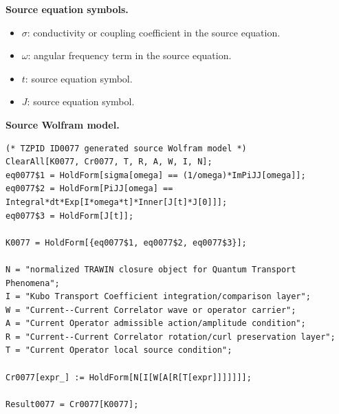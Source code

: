\begin{minipage}[t]{0.49\linewidth}
\begingroup
\small
\raggedright
\textbf{Source equation symbols.}\par
\begin{itemize}[leftmargin=1.35em,itemsep=1pt,topsep=1pt,parsep=0pt]
    \item $\sigma$: conductivity or coupling coefficient in the source equation.
    \item $\omega$: angular frequency term in the source equation.
    \item $t$: source equation symbol.
    \item $J$: source equation symbol.
\end{itemize}
\endgroup
\end{minipage}\hfill
\begin{minipage}[t]{0.47\linewidth}
\begingroup
\scriptsize
\raggedright
\textbf{Source Wolfram model.}\par
\begin{Verbatim}[fontsize=\tiny,breaklines=true,breakanywhere=true]
(* TZPID ID0077 generated source Wolfram model *)
ClearAll[K0077, Cr0077, T, R, A, W, I, N];
eq0077$1 = HoldForm[sigma[omega] == (1/omega)*ImPiJJ[omega]];
eq0077$2 = HoldForm[PiJJ[omega] == Integral*dt*Exp[I*omega*t]*Inner[J[t]*J[0]]];
eq0077$3 = HoldForm[J[t]];

K0077 = HoldForm[{eq0077$1, eq0077$2, eq0077$3}];

N = "normalized TRAWIN closure object for Quantum Transport Phenomena";
I = "Kubo Transport Coefficient integration/comparison layer";
W = "Current--Current Correlator wave or operator carrier";
A = "Current Operator admissible action/amplitude condition";
R = "Current--Current Correlator rotation/curl preservation layer";
T = "Current Operator local source condition";

Cr0077[expr_] := HoldForm[N[I[W[A[R[T[expr]]]]]]];

Result0077 = Cr0077[K0077];
\end{Verbatim}
\endgroup
\end{minipage}

